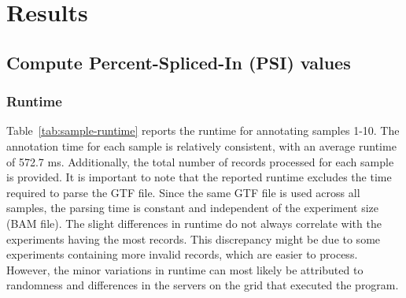 \documentclass{article}
\begin{document}
    \section{Results}\label{sec:results}

    \subsection{Compute Percent-Spliced-In (PSI) values}\label{subsec:compute-percent-spliced-in-(psi)-values-results}

    \subsubsection{Runtime}
    \begin{table}[]
        \centering
        \caption{Runtime for the annotation on the provided samples 1-10. with the number of records The BAM file were processed on the bioclient grid (write/read to/from HDD).}
        \label{tab:sample-runtime}
    \end{table}
    Table~\ref{tab:sample-runtime} reports the runtime for annotating samples 1-10. The annotation time for each sample is relatively consistent, with an average runtime of 572.7 ms. Additionally, the total number of records processed for each sample is provided. It is important to note that the reported runtime excludes the time required to parse the GTF file. Since the same GTF file is used across all samples, the parsing time is constant and independent of the experiment size (BAM file). The slight differences in runtime do not always correlate with the experiments having the most records. This discrepancy might be due to some experiments containing more invalid records, which are easier to process. However, the minor variations in runtime can most likely be attributed to randomness and differences in the servers on the grid that executed the program.
\end{document}
